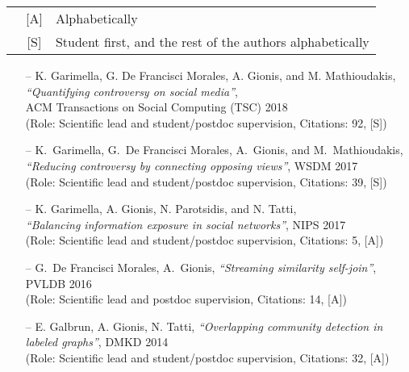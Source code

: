 \documentclass[a4paper,11pt]{res}
\begin{document}
\begin{resume}
{\begin{tabular}{rcl}
& {[A]} & Alphabetically \\
& {[S]} & Student first, and the rest of the authors alphabetically
\end{tabular}
}


\begin{itemize}

\smallskip
\item[--]
{K. Garimella, G. De Francisci Morales, A. Gionis, and M. Mathioudakis}, \\
{\em ``Quantifying controversy on social media''},\\
ACM Transactions on Social Computing (TSC) 2018 \\
(Role: Scientific lead and student/postdoc supervision, {Citations:} 92, [S])

\item[--] 
{K.\ Garimella, G.\ De Francisci Morales, A.\ Gionis, and M.\ Mathioudakis},\\
{\em ``Reducing controversy by connecting opposing views''}, 
WSDM 2017 \\
(Role: Scientific lead and student/postdoc supervision, {Citations:} 39, [S])

\item[--] 
{K. Garimella, A. Gionis, N. Parotsidis, and N. Tatti}, \\
{\em ``Balancing information exposure in social networks''}, 
NIPS 2017 \\
(Role: Scientific lead and student/postdoc supervision, {Citations:} 5, [A])

\iffalse
\item[--]
{E.\ Galbrun, A.\ Gionis, N.\ Tatti}, 
{\em ``Top-$k$ overlapping densest subgraphs''}, 
DMKD 2016
\\
(Role: Scientific lead and student/postdoc supervision, {Citations:} 6, [A])
\fi

\item[--]
{G.\ De Francisci Morales, A.\ Gionis}, 
{\em ``Streaming similarity self-join''}, 
PVLDB 2016
\\
(Role: Scientific lead and postdoc supervision, {Citations:} 14, [A])

\item [--]
{E. Galbrun, A. Gionis, N. Tatti}, 
{\em ``Overlapping community detection in labeled graphs''}, 
DMKD 2014
\\
(Role: Scientific lead and student/postdoc supervision, {Citations:} 32, [A])


\end{itemize}
\end{resume}
\end{document}
